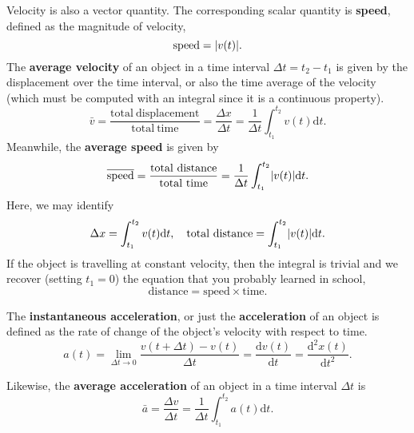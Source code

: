 \documentclass[../newtonian_mechanics.tex]{subfiles}
\begin{document}
        Velocity is also a vector quantity. The corresponding scalar quantity is \textbf{speed}, defined as the magnitude of velocity,
        \begin{equation}
            \mathrm{speed}=\lvert v(t)\rvert.
        \end{equation}
        The \textbf{average velocity} of an object in a time interval $\Delta t=t_2-t_1$ is given by the displacement over the time interval, or also the time average of the velocity (which must be computed with an integral since it is a continuous property).
        \begin{equation}
            \bar{v}=\frac{\mathrm{total\ displacement}}{\mathrm{total\ time}}=\frac{\Delta x}{\Delta t}=\frac{1}{\Delta t}\int_{t_1}^{t_2}v(t)\mathrm{d}t.
        \end{equation}
        Meanwhile, the \textbf{average speed} is given by
        \begin{equation}
            \overline{\mathrm{speed}}=\frac{\mathrm{total\ distance}}{\mathrm{total\ time}}=\frac{1}{\Delta t}\int_{t_1}^{t_2}\abs{v(t)}\mathrm{d}t.
        \end{equation}
        Here, we may identify
        \begin{equation}\label{tot-disp}
            \Delta x=\int_{t_1}^{t_2}v(t)\mathrm{d}t,\quad \mathrm{total\ distance}=\int_{t_1}^{t_2}\lvert v(t)\rvert\mathrm{d}t.
        \end{equation}
        If the object is travelling at constant velocity, then the integral is trivial and we recover (setting $t_1=0$) the equation that you probably learned in school,
        \begin{equation}
            \mathrm{distance}=\mathrm{speed}\times\mathrm{time}.
        \end{equation}
        \begin{definition}
            The \textbf{instantaneous acceleration}, or just the \textbf{acceleration} of an object is defined as the rate of change of the object's velocity with respect to time.
            \begin{equation}
                a(t)=\lim_{\Delta t\to0}\frac{v(t+\Delta t)-v(t)}{\Delta t}=\frac{\mathrm{d}v(t)}{\mathrm{d}t}=\frac{\mathrm{d}^2x(t)}{\mathrm{d}t^2}.
            \end{equation}
        \end{definition}
        Likewise, the \textbf{average acceleration} of an object in a time interval $\Delta t$ is
        \begin{equation}\label{av-acc}
            \bar{a}=\frac{\Delta v}{\Delta t}=\frac{1}{\Delta t}\int_{t_1}^{t_2}a(t)\mathrm{d}t.
        \end{equation}
\end{document}
